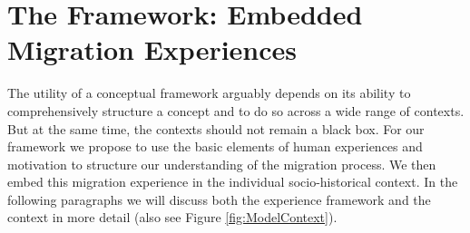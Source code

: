 \documentclass[man, 12pt, a4paper]{apa7}
\begin{document}
\section{The Framework: Embedded Migration Experiences}

The utility of a conceptual framework arguably depends on its ability to comprehensively structure a concept and to do so across a wide range of contexts. But at the same time, the contexts should not remain a black box. 
For our framework we propose to use the basic elements of human experiences and motivation to structure our understanding of the migration process. We then embed this migration experience in the individual socio-historical context. 
In the following paragraphs we will discuss both the experience framework and the context in more detail (also see Figure \ref{fig:ModelContext}).
\end{document}
